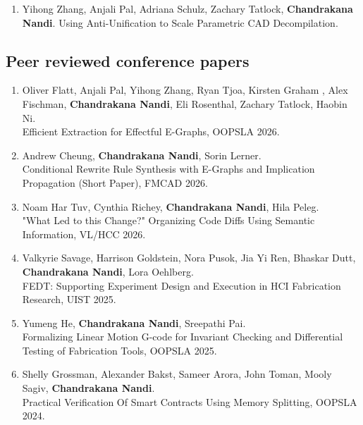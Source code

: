 \documentclass[margin, 10pt]{res} %
\begin{document}
\begin{resume}
\begin{enumerate}
  \item Yihong Zhang, Anjali Pal, Adriana Schulz, Zachary Tatlock, \textbf{Chandrakana Nandi}.
    Using Anti-Unification to Scale Parametric CAD Decompilation.

\end{enumerate}

\subsection{Peer reviewed conference papers}
\begin{enumerate}

  \item Oliver Flatt, Anjali Pal, Yihong Zhang, Ryan Tjoa, Kirsten Graham , Alex Fischman, \textbf{Chandrakana Nandi}, Eli Rosenthal, Zachary Tatlock, Haobin Ni. \\
  Efficient Extraction for Effectful E-Graphs, OOPSLA 2026. \\

  \item Andrew Cheung, \textbf{Chandrakana Nandi}, Sorin Lerner. \\
  Conditional Rewrite Rule Synthesis with E-Graphs and Implication Propagation (Short Paper), FMCAD 2026. \\

\item Noam Har Tuv, Cynthia Richey, \textbf{Chandrakana Nandi}, Hila Peleg. \\
  "What Led to this Change?" Organizing Code Diffs Using Semantic Information, VL/HCC 2026. \\

  \item Valkyrie Savage, Harrison Goldstein, Nora Pusok, Jia Yi Ren, Bhaskar Dutt, \textbf{Chandrakana Nandi}, Lora Oehlberg. \\
    FEDT: Supporting Experiment Design and Execution in HCI Fabrication Research, UIST 2025. \\

  \item Yumeng He, \textbf{Chandrakana Nandi}, Sreepathi Pai. \\
    Formalizing Linear Motion G-code for Invariant Checking and Differential Testing of Fabrication Tools, OOPSLA 2025. \\

  \item Shelly Grossman, Alexander Bakst, Sameer Arora, John Toman, Mooly Sagiv, \textbf{Chandrakana Nandi}. \\
    Practical Verification Of Smart Contracts Using Memory Splitting, OOPSLA 2024. \\



\end{enumerate}
\end{resume}
\end{document}
